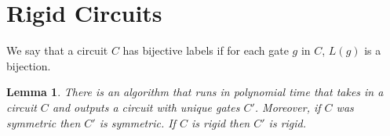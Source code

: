 \documentclass[12pt]{report}
\newtheorem{lem}[thm]{Lemma} \newtheorem{prop}[thm]{Proposition}
\begin{document}
\section{Rigid Circuits}

\begin{definition}
  We say that a circuit $C$ has bijective labels if for each gate $g$ in $C$,
  $L(g)$ is a bijection.
\end{definition}

\begin{lem}
  \label{lem:bij_labels}
  There is an algorithm that runs in polynomial time that takes in a circuit $C$
  and outputs a circuit with unique gates $C'$. Moreover, if $C$ was symmetric
  then $C'$ is symmetric. If $C$ is rigid then $C'$ is rigid.
\end{lem}
\end{document}
